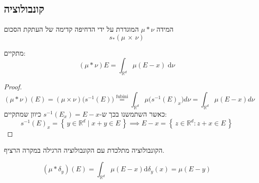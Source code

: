 \documentclass{tstextbook}
\begin{document}
\subsection{קונבולוציה}

\begin{definition}[קונבולוציה]
המידה \(\mu*\nu\) המוגדרת על ידי הדחיפה קדימה של העתקת הסכום
$$ s_{\ast}\left(\mu\,\times\,\nu\right)$$

\end{definition}
\begin{proposition}
מתקיים:
$$\left( \mu*\nu \right)E=\int _{\mathbb{R}^{d}}\mu(E-x) \;\mathrm{d} \nu $$

\end{proposition}
\begin{proof}
$$(\mu*\nu)(E)=(\mu\times\nu)\bigl(s^{-1}(E)\bigr)\stackrel{\text{fubini}}{=}\int_{\mathbb{R}^{d}}\mu\bigl(s^{-1}(E)_{x}\bigr)d\nu=\int_{\mathbb{R}^{d}}\mu(E-x)d\nu$$
כאשר השתמשנו בכך ש-\(s ^{-1}(E_{x})=E-x\) כיוון שמתקיים:
$$s^{-1}(E)_{x}=\left\{ \,y\in\mathbb{R}^{d}\mid x+y\in E\, \right\}\implies E-x=\left\{ \,z\in\mathbb{R}^{d}:z+x\in E\, \right\}$$

\end{proof}
\begin{remark}
הקונבולוציה מתלכדת עם הקונבולוציה הרגילה במקרה הרציף.

\end{remark}
\begin{proposition}
$$\left( \mu*\delta_{y} \right)(E)=\int_{\mathbb{R}^{d}}\mu(E-x)\mathrm{d}\delta_{y}(x)=\mu(E-y)$$

\end{proposition}
\end{document}
